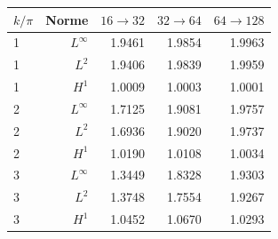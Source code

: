 \begin{tabular}{lrrrr}
\toprule
\(k/\pi\) & Norme & \(16\to32\) & \(32\to64\) & \(64\to128\) \\
\midrule
1 & \(L^\infty\) & 1.9461 & 1.9854 & 1.9963 \\
1 & \(L^2\) & 1.9406 & 1.9839 & 1.9959 \\
1 & \(H^1\) & 1.0009 & 1.0003 & 1.0001 \\
2 & \(L^\infty\) & 1.7125 & 1.9081 & 1.9757 \\
2 & \(L^2\) & 1.6936 & 1.9020 & 1.9737 \\
2 & \(H^1\) & 1.0190 & 1.0108 & 1.0034 \\
3 & \(L^\infty\) & 1.3449 & 1.8328 & 1.9303 \\
3 & \(L^2\) & 1.3748 & 1.7554 & 1.9267 \\
3 & \(H^1\) & 1.0452 & 1.0670 & 1.0293 \\
\bottomrule
\end{tabular}
